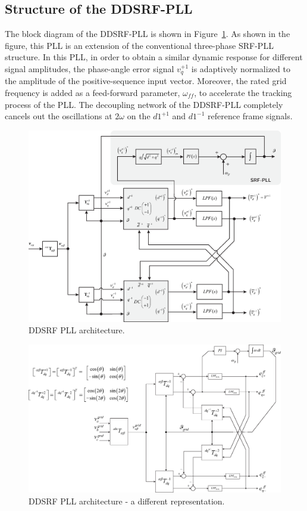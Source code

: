 \documentclass[11pt,a4paper,oneside]{book}
\numberwithin{equation}{section}
\theoremstyle{it}
\theoremstyle{definition}
\begin{document}
\begin{onehalfspace}
\subsection{Structure of the DDSRF-PLL}
The block diagram of the DDSRF-PLL is shown in Figure~\ref{ddsrf_pll_5}. As shown in the figure, this PLL is an extension of the conventional three-phase SRF-PLL structure. In this PLL, in order to obtain a similar dynamic response for different signal amplitudes, the phase-angle error signal $v_q^{+1}$ is adaptively normalized to the amplitude of the positive-sequence input vector. Moreover, the rated grid frequency is added as a feed-forward parameter, $\omega_{ff}$, to accelerate the tracking process of the PLL. The decoupling network of the DDSRF-PLL completely cancels out the oscillations at $2\omega$ on the $d1^{+1}$ and $d1^{-1}$ reference frame signals. 
\begin{figure}[H]
	\centering
	\includegraphics[width = 400pt, angle = 0, 
	keepaspectratio]{figures/pll/ddsrf_pll_5.eps}
	\captionsetup{width=0.5\textwidth, font=small}	
	\caption{DDSRF PLL architecture.}
	\label{ddsrf_pll_5}
\end{figure}
\begin{figure}[H]
	\centering
	\includegraphics[width = 400pt, angle = 0, 
	keepaspectratio]{figures/pll/ddsrf_pll_1.eps}
	\captionsetup{width=0.5\textwidth, font=small}	
	\caption{DDSRF PLL architecture - a different representation.}
	\label{ddsrf_pll_1}
\end{figure}

\end{onehalfspace}
\end{document}
